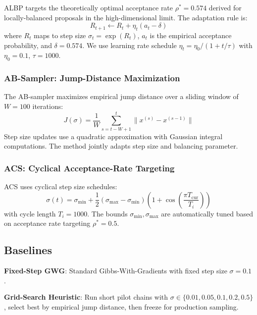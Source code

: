 \documentclass{article}
\begin{document}
ALBP \citep{sun2022optimal} targets the theoretically optimal acceptance rate $\rho^* = 0.574$ derived for locally-balanced proposals in the high-dimensional limit. The adaptation rule is:
\begin{equation}
    R_{t+1} \leftarrow R_t + \eta_t(a_t - \delta)
\end{equation}
where $R_t$ maps to step size $\sigma_t = \exp(R_t)$, $a_t$ is the empirical acceptance probability, and $\delta = 0.574$. We use learning rate schedule $\eta_t = \eta_0 / (1 + t/\tau)$ with $\eta_0 = 0.1$, $\tau = 1000$.

\subsubsection{AB-Sampler: Jump-Distance Maximization}

The AB-sampler \citep{sun2023anyscale} maximizes empirical jump distance over a sliding window of $W=100$ iterations:
\begin{equation}
    J(\sigma) = \frac{1}{W}\sum_{s=t-W+1}^{t} \|x^{(s)} - x^{(s-1)}\|
\end{equation}
Step size updates use a quadratic approximation with Gaussian integral computations. The method jointly adapts step size and balancing parameter.

\subsubsection{ACS: Cyclical Acceptance-Rate Targeting}

ACS \citep{pynadath2024gradient} uses cyclical step size schedules:
\begin{equation}
    \sigma(t) = \sigma_{\min} + \frac{1}{2}(\sigma_{\max} - \sigma_{\min})\left(1 + \cos\left(\frac{\pi T_{\text{cur}}}{T_i}\right)\right)
\end{equation}
with cycle length $T_i = 1000$. The bounds $\sigma_{\min}, \sigma_{\max}$ are automatically tuned based on acceptance rate targeting $\rho^* = 0.5$.

\subsection{Baselines}

\textbf{Fixed-Step GWG}: Standard Gibbs-With-Gradients with fixed step size $\sigma = 0.1$ \citep{grathwohl2021oops}.

\textbf{Grid-Search Heuristic}: Run short pilot chains with $\sigma \in \{0.01, 0.05, 0.1, 0.2, 0.5\}$, select best by empirical jump distance, then freeze for production sampling.
\end{document}

